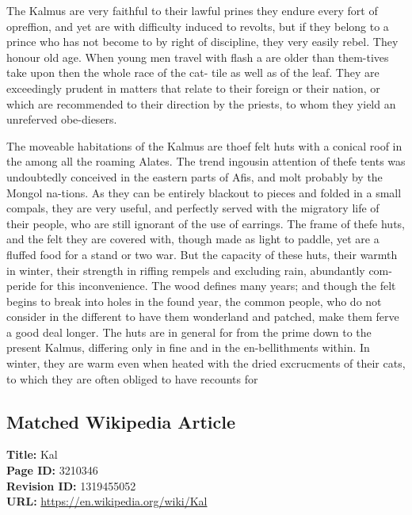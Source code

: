 \documentclass{article}
\begin{document}
The Kalmus are very faithful to their lawful prines they endure every fort of opreffion, and yet are with difficulty induced to revolts, but if they belong to a prince who has not become to by right of discipline, they very easily rebel. They honour old age. When young men travel with flash a are older than them-tives take upon then the whole race of the cat- tile as well as of the leaf. They are exceedingly prudent in matters that relate to their foreign or their nation, or which are recommended to their direction by the priests, to whom they yield an unreferved obe-diesers.

The moveable habitations of the Kalmus are thoef felt huts with a conical roof in the among all the roaming Alates. The trend ingousin attention of thefe tents was undoubtedly conceived in the eastern parts of Afis, and molt probably by the Mongol na-tions. As they can be entirely blackout to pieces and folded in a small compals, they are very useful, and perfectly served with the migratory life of their people, who are still ignorant of the use of earrings. The frame of thefe huts, and the felt they are covered with, though made as light to paddle, yet are a fluffed food for a stand or two war. But the capacity of these huts, their warmth in winter, their strength in riffing rempels and excluding rain, abundantly com-peride for this inconvenience. The wood defines many years; and though the felt begins to break into holes in the found year, the common people, who do not consider in the different to have them wonderland and patched, make them ferve a good deal longer. The huts are in general for from the prime down to the present Kalmus, differing only in fine and in the en-bellithments within. In winter, they are warm even when heated with the dried excrucments of their cats, to which they are often obliged to have recounts for

\subsection*{Matched Wikipedia Article}
\textbf{Title:} Kal \\
\textbf{Page ID:} 3210346 \\
\textbf{Revision ID:} 1319455052 \\
\textbf{URL:} \url{https://en.wikipedia.org/wiki/Kal}
\end{document}

